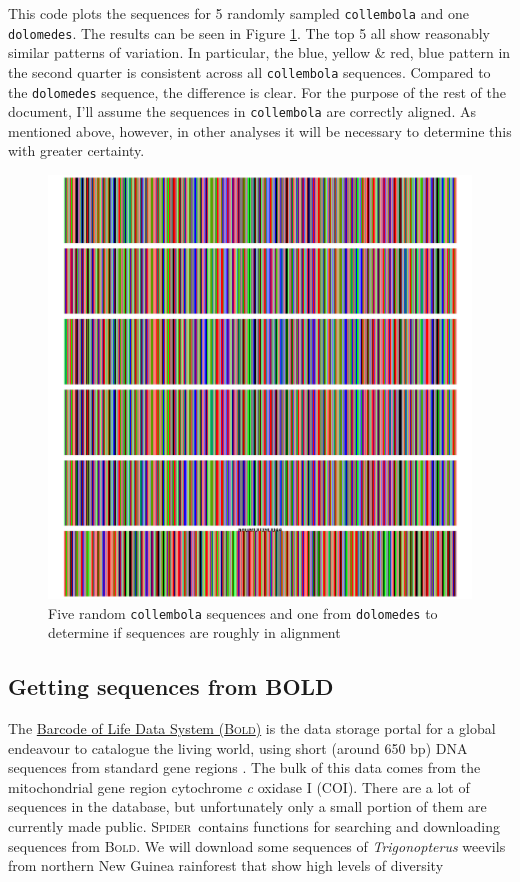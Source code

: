 \documentclass{article}
\newcommand{\Spider}{\textsc{Spider}} %
\newcommand{\scinm}{\emph}
\newcommand{\progname}[1]{\textsc{#1}}
\newcommand{\fun}[1]{\texttt{#1}}
\begin{document}
This code plots the sequences for 5 randomly sampled \fun{collembola} and one \fun{dolomedes}. The results can be seen in Figure \ref{seeBarcode.fig}. The top 5 all show reasonably similar patterns of variation. In particular, the blue, yellow \& red, blue pattern in the second quarter is consistent across all \fun{collembola} sequences. Compared to the \fun{dolomedes} sequence, the difference is clear. For the purpose of the rest of the document, I'll assume the sequences in \fun{collembola} are correctly aligned. As mentioned above, however, in other analyses it will be necessary to determine this with greater certainty.

\begin{figure}[tbp]
	\includegraphics[width=\textwidth]{seeBarcode}
	\caption{Five random \fun{collembola} sequences and one from \fun{dolomedes} to determine if sequences are roughly in alignment}
	\label{seeBarcode.fig}
\end{figure}



\subsection{Getting sequences from BOLD}
\label{BOLD.section}
The \href{http://www.barcodinglife.com}{Barcode of Life Data System (\progname{Bold})} is the data storage portal for a global endeavour to catalogue the living world, using short (around 650 bp) DNA sequences from standard gene regions \citep{Ratnasingham2007}. The bulk of this data comes from the mitochondrial gene region cytochrome \emph{c} oxidase I (COI). There are a lot of sequences in the database, but unfortunately only a small portion of them are currently made public. \Spider~contains functions for searching and downloading sequences from \progname{Bold}. We will download some sequences of \scinm{Trigonopterus} weevils from northern New Guinea rainforest that show high levels of diversity \citep{Ried.etal.2010,Ried.2010}
\end{document}
